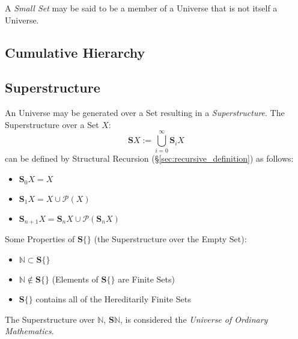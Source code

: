 A \emph{Small Set} may be said to be a member of a Universe that is
not itself a Universe.



\subsection{Cumulative Hierarchy}\label{sec:cumulative_hierarchy}

\subsection{Superstructure}\label{sec:superstructure}

An Universe may be generated over a Set resulting in a
\emph{Superstructure}. The Superstructure over a Set $X$:
\[
  \mathbf{S}X := \bigcup^{\infty}_{i=0}\mathbf{S}_i X
\]
can be defined by Structural Recursion
(\S\ref{sec:recursive_definition}) as follows:
\begin{itemize}

\item $\mathbf{S}_0 X = X$
\item $\mathbf{S}_1 X = X \cup \mathcal{P}(X)$
\item $\mathbf{S}_{n+1} X =
  \mathbf{S}_n X \cup \mathcal{P}(\mathbf{S}_n X)$

\end{itemize}
Some Properties of $\mathbf{S}\{\}$ (the Superstructure over the Empty
Set):
\begin{itemize}

\item $\mathbb{N} \subset \mathbf{S}\{\}$
\item $\mathbb{N} \notin \mathbf{S}\{\}$ (Elements of $\mathbf{S}\{\}$
  are Finite Sets)
\item $\mathbf{S}\{\}$ contains all of the Hereditarily Finite Sets

\end{itemize}

The Superstructure over $\mathbb{N}$, $\mathbf{S}\mathbb{N}$, is
considered the \emph{Universe of Ordinary Mathematics}.



